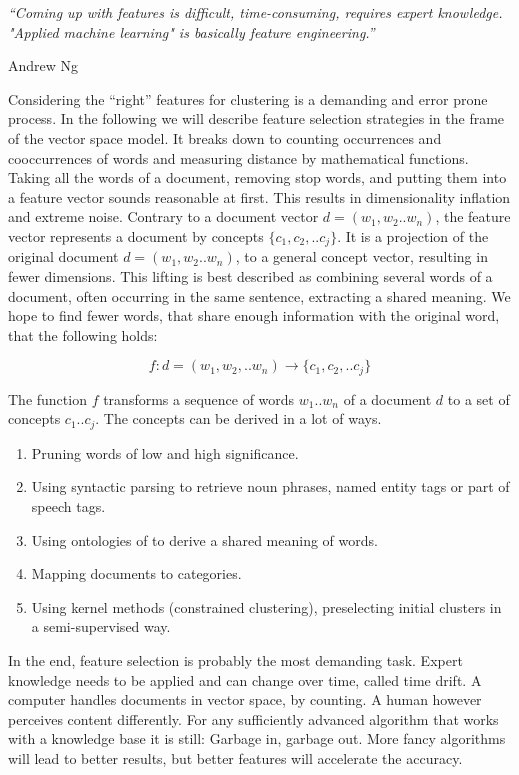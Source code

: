 \epigraph{\emph{
  ``Coming up with features is difficult, time-consuming, requires expert knowledge. "Applied machine learning" is basically feature engineering.''
}}{ Andrew Ng }

Considering the ``right'' features for clustering is a demanding and error prone process. In the following we will describe feature selection strategies in the frame of the vector space model. It breaks down to counting occurrences and cooccurrences of words and measuring distance by mathematical functions. Taking all the words of a document, removing stop words, and putting them into a feature vector sounds reasonable at first. This results in dimensionality inflation and extreme noise. Contrary to a document vector $d = (w_1,w_2..w_n)$, the feature vector represents a document by concepts $\{c_1,c_2,..c_j\}$. It is a projection of the original document $d = (w_1,w_2..w_n)$, to a general concept vector, resulting in fewer dimensions. This lifting is best described as combining several words of a document, often occurring in the same sentence, extracting a shared meaning. We hope to find fewer words, that share enough information with the original word, that the following holds:
  
  \begin{equation}
    f : d=(w_1,w_2,..w_n) \to \{c_1,c_2,..c_j\}
  \end{equation}

The function $f$ transforms a sequence of words $w_1..w_n$ of a document $d$ to a set of concepts $c_1..c_j$. The concepts can be derived in a lot of ways.

  \begin{enumerate}
    \item Pruning words of low and high significance.
    \item Using syntactic parsing to retrieve noun phrases, named entity tags or part of speech tags.
    \item Using ontologies of \wordnet{} to derive a shared meaning of words.
    \item Mapping documents to \wiki{} categories.
    \item Using kernel methods (constrained clustering), preselecting initial clusters in a semi-supervised way.
  \end{enumerate}

In the end, feature selection is probably the most demanding task. Expert knowledge needs to be applied and can change over time, called time drift. A computer handles documents in vector space, by counting. A human however perceives content differently. For any sufficiently advanced algorithm that works with a knowledge base it is still: Garbage in, garbage out. More fancy algorithms will lead to better results, but better features will accelerate the accuracy.\\

